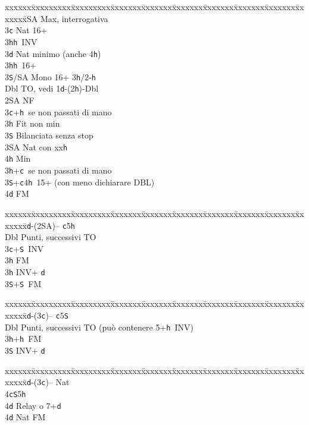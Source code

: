 \documentclass[a4paper,italian]{article}
\newcommand{\BS}{\small{\texttt{S}}}
\newcommand{\BC}{\small{\texttt{c}}}
\newcommand{\BD}{\small{\texttt{d}}}
\newcommand{\BH}{\small{\texttt{h}}}
\newenvironment{bidtable}
{\begin{tabbing}

    xxxxxx\=xxxxxxxxx\=xxxxxxxxx\=xxxxxxx\=xxxxxxx\=xxxxxxx\=xxxxxxx\=xxxxxxx\=xxxxxxx\=xxxxxxx\=\kill}
{\end{tabbing} }%
\begin{document}
\begin{multicols}{2}
\begin{bidtable}
        2\small{SA}\> Max, interrogativa\+\\
        3\BC\> Nat 16+\+\\
        3\BH{}\BH\ INV\-\\
        3\BD\> Nat minimo (anche 4\BH)\\
        3\BH{}\BH\ 16+\\
        3\BS/SA\> Mono 16+ 3\BH/2-\BH\-\-\-\\
        Dbl \> TO, vedi 1\BD-(2\BH)-Dbl\\
        2\small{SA} \> NF\\
        3\BC {}+\BH\ se non passati di mano\+\\
        3\BH \> Fit non min\\
        3\BS \> Bilanciata senza stop\\
        3\small{SA} \> Nat con xx\BH \\
        4\BH \> Min\-\\
        3\BH {}+\BC\ se non passati di mano\\
        3\BS {}+\BC 4\BH\ 15+ (con meno dichiarare DBL)\\
        4\BD \> FM\-
    \end{bidtable}

    \columnbreak

    \begin{bidtable}
        1\BD-(2\small{SA})-- \> \BC 5\BH \+\\
        Dbl \> Punti, successivi TO\\
        3\BC {}+\BS\ INV\+\\
        3\BH \> FM\-\\
        3\BH \> INV+ \BD \\
        3\BS {}+\BS\ FM\-
    \end{bidtable}
    \begin{bidtable}
        1\BD-(3\BC)-- \> \BC 5\BS \+\\
        Dbl \> Punti, successivi TO (può contenere 5+\BH\ INV)\\
        3\BH {}+\BH\ FM\\
        3\BS \> INV+ \BD \-
    \end{bidtable}
    \begin{bidtable}
        1\BD-(3\BC)-- \> \> Nat\+\\
        4\BC {}\BS 5\BH \+\\
        4\BD \> Relay o 7+\BD \-\\
        4\BD \> Nat FM\-
    \end{bidtable}


\end{multicols}
\end{document}
